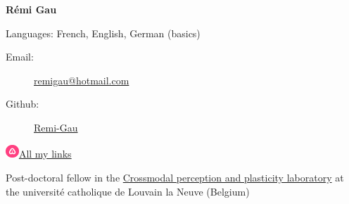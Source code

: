 \documentclass[a4paper,12pt,oneside]{letter}
\date{2021-04-10}
\begin{document}
\textbf{{\LARGE Rémi Gau}}

Languages: French, English, German (basics)

\doubleline

\begin{minipage}{.49\textwidth}
\begin{description}
    \item[Email:]
        \href{mailto:remi\textunderscore gau@hotmail.com}
            {remi\textunderscore gau@hotmail.com}
    \item[Github:]
        \href{https://github.com/Remi-Gau}{Remi-Gau}              
 \end{description}
\end{minipage}
\begin{minipage}{.49\textwidth}
\begin{description}
    \item[\href{https://allmylinks.com/remi-gau}
                {\includegraphics[width=0.5cm]{./images/allmylinks.png}All my links}]
\end{description}
\end{minipage}
\vspace{10pt}

\doubleline


{



Post-doctoral fellow in the \href{https://cpplab.be/}{Crossmodal perception and plasticity laboratory}
at the université catholique de Louvain la Neuve (Belgium)























% 

}
\end{document}
